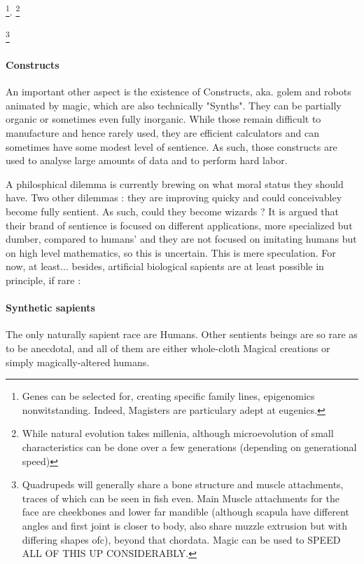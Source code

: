\footnote{Genes can be selected for, creating specific family lines, epigenomics nonwitstanding. Indeed, Magisters are particulary adept at eugenics.}. \footnote{While natural evolution takes millenia, although microevolution of small characteristics can be done over a few generations (depending on generational speed)}


\footnote{Quadrupeds will generally share a bone structure and muscle attachments, traces of which can be seen in fish even. Main Muscle attachments for the face are cheekbones and lower far mandible (although scapula have different angles and first joint is closer to body, also share muzzle extrusion but with differing shapes ofc), beyond that chordata. Magic can be used to SPEED ALL OF THIS UP CONSIDERABLY.}


\paragraph{Constructs}


An important other aspect is the existence of Constructs, aka. golem and robots animated by magic, which are also technically "Synths". They can be partially organic or sometimes even fully inorganic. While those remain difficult to manufacture and hence rarely used, they are efficient calculators and can sometimes have some modest level of sentience. As such, those constructs are used to analyse large amounts of data and to perform hard labor. 


A philosphical dilemma is currently brewing on what moral status they should have.
Two other dilemmas : they are improving quicky and could conceivabley become fully sentient. As such, could they become wizards ? It is argued that their brand of sentience is focused on different applications, more specialized but dumber, compared to humans' and they are not focused on imitating humans but on high level mathematics, so this is uncertain. This is mere speculation. For now, at least... besides, artificial biological sapients are at least possible in principle, if rare :








\paragraph{Synthetic sapients}

The only naturally sapient race are Humans. Other sentients beings are so rare as to be anecdotal, and all of them are either whole-cloth Magical creations or simply magically-altered humans. 


